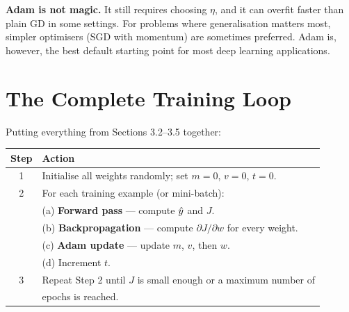 \documentclass[12pt, a4paper]{article}
\begin{document}
\begin{warnbox}
  \textbf{Adam is not magic.}
  It still requires choosing $\eta$, and it can overfit faster than plain GD
  in some settings.  For problems where generalisation matters most, simpler
  optimisers (SGD with momentum) are sometimes preferred.  Adam is, however,
  the best default starting point for most deep learning applications.
\end{warnbox}

\section{The Complete Training Loop}

Putting everything from Sections 3.2--3.5 together:

\vspace{0.5em}
\begin{center}
  \renewcommand{\arraystretch}{1.5}
  \begin{tabular}{cl}
    \toprule
    Step & Action                                                                 \\
    \midrule
    1    & Initialise all weights randomly; set $m = 0$, $v = 0$, $t = 0$.        \\
    2    & For each training example (or mini-batch):                             \\
         & \quad (a) \textbf{Forward pass} --- compute $\hat{y}$ and $J$.           \\
         & \quad (b) \textbf{Backpropagation} --- compute $\partial J/\partial w$
    for every weight.                                                             \\
         & \quad (c) \textbf{Adam update} --- update $m$, $v$, then $w$.          \\
         & \quad (d) Increment $t$.                                               \\
    3    & Repeat Step 2 until $J$ is small enough or a maximum number of         \\
         & epochs is reached.                                                     \\
    \bottomrule
  \end{tabular}
\end{center}
\end{document}
